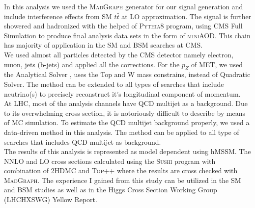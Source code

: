 \documentclass[12pt]{article}
\begin{document}
In this analysis we used the \textsc{MadGraph} generator for our signal generation and include interference effects from SM $t\bar t$ at LO approximation. The signal is further showered and hadronized with the helped of \textsc{Pythia8} program, using CMS Full Simulation to produce final analysis data sets in the form of \textsc{miniAOD}. This chain has majority of application in the SM and BSM searches at CMS.\\
We used almost all particles detected by the CMS detector namely electron, muon, jets (b-jets) and applied all the corrections. For the $p_{Z}$ of MET, we used the Analytical Solver \cite{second2}, uses the Top and W mass constrains, instead of Quadratic Solver. The method can be extended to all types of searches that include neutrino(s) to precisely reconstruct it's longitudinal component of momentum.\\
At LHC, most of the analysis channels have QCD multijet as a background. Due to its overwhelming cross section, it is notoriously difficult to describe by means of MC simulation. To estimate the QCD multijet background properly, we used a data-driven method in this analysis. The method can be applied to all type of searches that includes QCD multijet as background.\\ 
The results of this analysis is represented as model dependent using hMSSM. The NNLO and LO cross sections calculated using the \textsc{Sushi} program with combination of \textsc{2HDMC} and \textsc{Top++} where the results are cross checked with \textsc{MadGraph}. The experience I gained from this study can be utilized in the SM and BSM studies as well as in the Higgs Cross Section Working Group (LHCHXSWG) Yellow Report.
\end{document}
